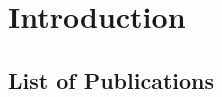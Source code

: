 
\chapter{Introduction}
\label{ch:intro}

\label{ch1:sec:intro}

\label{ch1:sec:model}

\label{ch1:sec:related}

\section{List of Publications}
\label{ch1:sec:publications}


